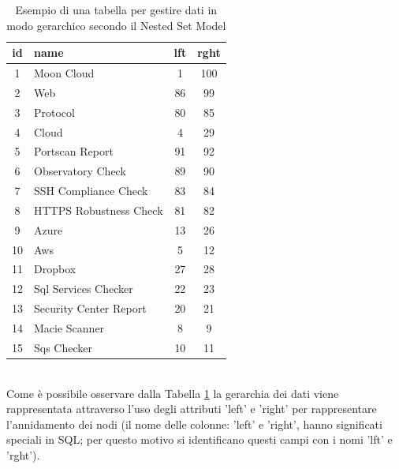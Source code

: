 \begin{table}[ht!]
\centering
\begin{tabular}[c]{| c | l | c | c |} 
	\hline
	id & name & lft & rght \\ [0.5ex] 
	\hline
	\rowcolor{rootnodecell} 1 & Moon Cloud & 1 & 100 \\ [0.5ex] 
	\rowcolor{categorycell} 2 & Web & 86 & 99 \\ [0.5ex] 
	\rowcolor{categorycell} 3 & Protocol & 80 & 85 \\ [0.5ex] 
	\rowcolor{categorycell} 4 & Cloud & 4 & 29 \\ [0.5ex] 
	\rowcolor{evaluationcell} 5 & Portscan Report & 91 & 92 \\ [0.5ex] 
	\rowcolor{evaluationcell} 6 & Observatory Check & 89 & 90 \\ [0.5ex] 
	\rowcolor{evaluationcell} 7 & SSH Compliance Check & 83 & 84 \\ [0.5ex] 
	\rowcolor{evaluationcell} 8 & HTTPS Robustness Check & 81 & 82 \\ [0.5ex] 
	\rowcolor{categorycell} 9 & Azure & 13 & 26 \\ [0.5ex] 
	\rowcolor{categorycell} 10 & Aws & 5 & 12 \\ [0.5ex] 
	\rowcolor{categorycell} 11 & Dropbox & 27 & 28 \\ [0.5ex] 
	\rowcolor{evaluationcell} 12 & Sql Services Checker & 22 & 23 \\ [0.5ex] 
	\rowcolor{evaluationcell} 13 & Security Center Report & 20 & 21 \\ [0.5ex] 
	\rowcolor{evaluationcell} 14 & Macie Scanner & 8 & 9 \\ [0.5ex] 
	\rowcolor{evaluationcell} 15 & Sqs Checker & 10 & 11 \\ [0.5ex]
	\hline
\end{tabular}
\caption{Esempio di una tabella per gestire dati in modo gerarchico secondo il Nested Set Model}
\label{table:nested_set_model_table}
\end{table}
\ \\
Come è possibile osservare dalla Tabella \ref{table:nested_set_model_table} la gerarchia dei dati viene rappresentata attraverso l'uso 
degli attributi 'left' e 'right' per rappresentare l'annidamento dei nodi (il nome delle colonne: 'left' e 'right', hanno significati 
speciali in SQL; per questo motivo si identificano questi campi con i nomi 'lft' e 'rght').

